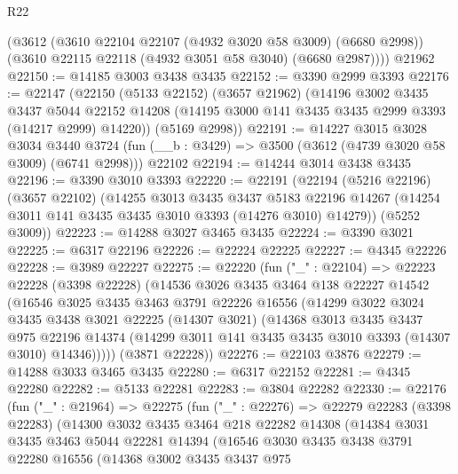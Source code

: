 \begin{lexlean}{R22}
\begin{coremodule}
      (@3612
        (@3610 @22104 @22107 (@4932 @3020 @58 @3009) (@6680 @2998))
        (@3610 @22115 @22118 (@4932 @3051 @58 @3040) (@6680 @2987))))
    @21962
@22150 := @14185 @3003 @3438 @3435
@22152 := @3390 @2999 @3393
@22176 := @22147
    (@22150
      (@5133 @22152)
      (@3657 @21962)
      (@14196
        @3002
        @3435
        @3437
        @5044
        @22152
        @14208
        (@14195 @3000 @141 @3435 @3435 @2999 @3393 (@14217 @2999) @14220))
      (@5169 @2998))
@22191 := @14227
    @3015
    @3028
    @3034
    @3440
    @3724
    (fun (__b : @3429) => @3500 (@3612 (@4739 @3020 @58 @3009) (@6741 @2998)))
    @22102
@22194 := @14244 @3014 @3438 @3435
@22196 := @3390 @3010 @3393
@22220 := @22191
    (@22194
      (@5216 @22196)
      (@3657 @22102)
      (@14255
        @3013
        @3435
        @3437
        @5183
        @22196
        @14267
        (@14254 @3011 @141 @3435 @3435 @3010 @3393 (@14276 @3010) @14279))
      (@5252 @3009))
@22223 := @14288 @3027 @3465 @3435
@22224 := @3390 @3021
@22225 := @6317 @22196
@22226 := @22224 @22225
@22227 := @4345 @22226
@22228 := @3989 @22227
@22275 := @22220
    (fun ("_" : @22104) =>
    @22223
      @22228
      (@3398 @22228)
      (@14536
        @3026
        @3435
        @3464
        @138
        @22227
        @14542
        (@16546
          @3025
          @3435
          @3463
          @3791
          @22226
          @16556
          (@14299
            @3022
            @3024
            @3435
            @3438
            @3021
            @22225
            (@14307 @3021)
            (@14368
              @3013
              @3435
              @3437
              @975
              @22196
              @14374
              (@14299 @3011 @141 @3435 @3435 @3010 @3393 (@14307 @3010) @14346)))))
      (@3871 @22228))
@22276 := @22103 @3876
@22279 := @14288 @3033 @3465 @3435
@22280 := @6317 @22152
@22281 := @4345 @22280
@22282 := @5133 @22281
@22283 := @3804 @22282
@22330 := @22176
    (fun ("_" : @21964) =>
    @22275
      (fun ("_" : @22276) =>
      @22279
        @22283
        (@3398 @22283)
        (@14300
          @3032
          @3435
          @3464
          @218
          @22282
          @14308
          (@14384
            @3031
            @3435
            @3463
            @5044
            @22281
            @14394
            (@16546
              @3030
              @3435
              @3438
              @3791
              @22280
              @16556
              (@14368
                @3002
                @3435
                @3437
                @975

\end{coremodule}
\end{lexlean}

